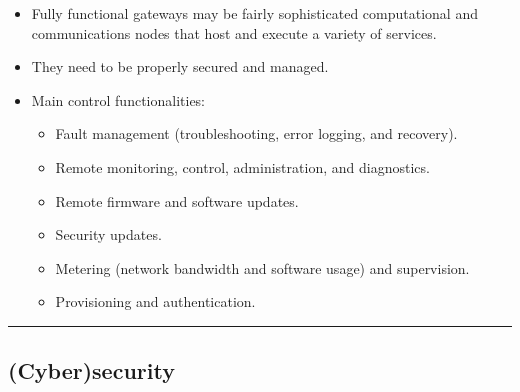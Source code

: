 \documentclass[a4paper, 12pt]{book} %
\begin{document}
\begin{itemize}
\tightlist
\item
  Fully functional gateways may be fairly sophisticated computational
  and communications nodes that host and execute a variety of services.
\item
  They need to be properly secured and managed.
\item
  Main control functionalities:

  \begin{itemize}
  \tightlist
  \item
    Fault management (troubleshooting, error logging, and recovery).
  \item
    Remote monitoring, control, administration, and diagnostics.
  \item
    Remote firmware and software updates.
  \item
    Security updates.
  \item
    Metering (network bandwidth and software usage) and supervision.
  \item
    Provisioning and authentication.
  \end{itemize}
\end{itemize}

\begin{center}\rule{0.5\linewidth}{0.5pt}\end{center}

\subsection{(Cyber)security}\label{cybersecurity}
\end{document}
